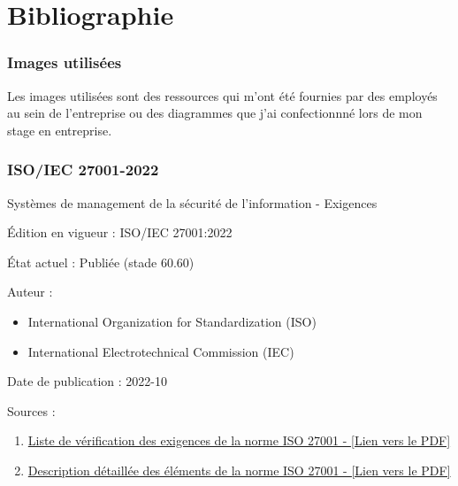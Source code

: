 \section*{Bibliographie}
\subsubsection{Images utilisées}\label{images}
Les images utilisées sont des ressources qui m'ont été fournies par des employés au sein de l'entreprise ou des diagrammes que j'ai confectionnné lors de mon stage en entreprise.

\subsubsection{ISO/IEC 27001-2022}\label{iso}
Systèmes de management de la sécurité de l'information - Exigences\par
Édition en vigueur : ISO/IEC 27001:2022\par
État actuel : Publiée (stade 60.60)\par
Auteur : 
\begin{itemize}
    \item International Organization for Standardization (ISO)
    \item International Electrotechnical Commission (IEC)
\end{itemize}\par
Date de publication : 2022-10\par
Sources : 
\begin{enumerate}
    \item \href{https://www.cssia.org/wp-content/uploads/2020/01/ISO_27001_Standard.pdf}{\textcolor{imtneCeleste}{Liste de vérification des exigences de la norme ISO 27001 - [Lien vers le PDF]}}
    \item \href{http://www.itref.ir/uploads/editor/2ef522.pdf}{\textcolor{imtneCeleste}{Description détaillée des éléments de la norme ISO 27001 - [Lien vers le PDF]}}
\end{enumerate}

